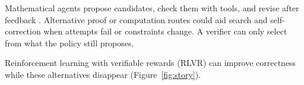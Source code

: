 Mathematical agents propose candidates, check them with tools, and revise after
feedback \citep{brown2024monkeys,snell2024testtime}. Alternative proof or
computation routes could aid search and self-correction when attempts fail or
constraints change. A verifier can only select from what the policy still proposes.

Reinforcement learning with verifiable rewards (RLVR) can improve correctness
while these alternatives disappear \citep{guo2025deepseekr1}
(Figure~\ref{fig:story}).

